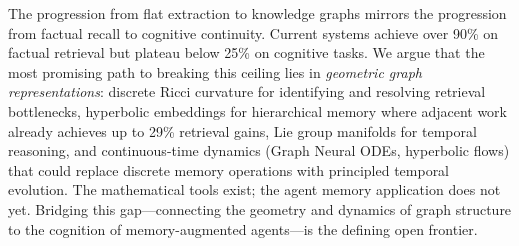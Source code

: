 \documentclass[hf]{ceurart}
\begin{document}
The progression from flat extraction to knowledge graphs mirrors the
progression from factual recall to cognitive continuity. Current systems
achieve over 90\% on factual retrieval but plateau below 25\% on
cognitive tasks. We argue that the most promising path to breaking this
ceiling lies in \emph{geometric graph representations}: discrete Ricci
curvature for identifying and resolving retrieval bottlenecks,
hyperbolic embeddings for hierarchical memory where adjacent work
already achieves up to 29\% retrieval gains, Lie group manifolds
for temporal reasoning, and continuous-time dynamics (Graph Neural ODEs,
hyperbolic flows) that could replace discrete memory operations with
principled temporal evolution. The mathematical tools exist; the agent
memory application does not yet. Bridging this gap---connecting the
geometry and dynamics of graph structure to the cognition of memory-augmented
agents---is the defining open frontier.
\end{document}
